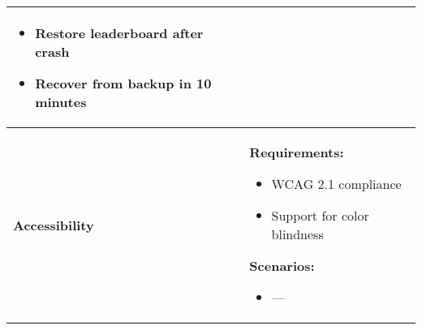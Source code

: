 \begin{tabularx}{\textwidth}{|p{4.8cm}|X|}
\begin{itemize}
        \item Restore leaderboard after crash
        \item Recover from backup in 10 minutes
    \end{itemize} \\
    \hline
    \textbf{Accessibility} &
    \textbf{Requirements:}
    \begin{itemize}
        \item WCAG 2.1 compliance
        \item Support for color blindness
    \end{itemize}
    \textbf{Scenarios:}
    \begin{itemize}
        \item ---
    \end{itemize} \\
    \hline
\end{tabularx}
